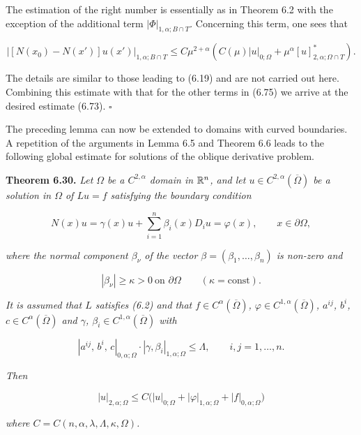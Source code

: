 \medskip

The estimation of the right number is essentially as in Theorem 6.2 with the
exception of the additional term $|\Phi|_{1,\alpha;B\cap T}$. Concerning this term, one sees that

\[
|[N(x_0)-N(x') ]u(x')|_{1,\alpha;B\cap T}\le C\mu^{2+\alpha}(C(\mu)|u|_{0;\Omega}+\mu^\alpha[u]^*_{2,\alpha;\Omega\cap T}).
\]

The details are similar to those leading to (6.19) and are not carried out here.
Combining this estimate with that for the other terms in (6.75) we arrive at the
desired estimate (6.73). $\square$

\medskip

The preceding lemma can now be extended to domains with curved boundaries.
A repetition of the arguments in Lemma 6.5 and Theorem 6.6 leads to the following
global estimate for solutions of the oblique derivative problem.

\medskip

\noindent\textbf{Theorem 6.30.} \textit{Let $\Omega$ be a $C^{2,\alpha}$ domain in $\mathbb{R}^n$, and let $u\in C^{2,\alpha}(\overline{\Omega})$ be a solution in
$\Omega$ of $Lu=f$ satisfying the boundary condition}

\[
N(x)u=\gamma(x)u+\sum_{i=1}^n \beta_i(x)D_i u=\varphi(x),\qquad x\in\partial\Omega,
\]

\textit{where the normal component $\beta_\nu$ of the vector $\beta=(\beta_1,\dots,\beta_n)$ is non-zero and}

\begin{equation}\tag{6.76}
|\beta_\nu|\ge \kappa>0\ \text{on }\partial\Omega \qquad (\kappa=\text{const}).
\end{equation}

\textit{It is assumed that $L$ satisfies (6.2) and that $f\in C^\alpha(\overline{\Omega})$, $\varphi\in C^{1,\alpha}(\overline{\Omega})$, $a^{ij}$, $b^i$, $c\in C^\alpha(\overline{\Omega})$
and $\gamma$, $\beta_i\in C^{1,\alpha}(\overline{\Omega})$ with}

\[
|a^{ij},\,b^i,\,c|_{0,\alpha;\Omega}\cdot|\gamma,\beta_i|_{1,\alpha;\Omega}\le \Lambda,\qquad i,j=1,\dots,n.
\]

\textit{Then}

\begin{equation}\tag{6.77}
|u|_{2,\alpha;\Omega}\le C\bigl(|u|_{0;\Omega}+|\varphi|_{1,\alpha;\Omega}+|f|_{0,\alpha;\Omega}\bigr)
\end{equation}

\textit{where $C=C(n,\alpha,\lambda,\Lambda,\kappa,\Omega)$.}

